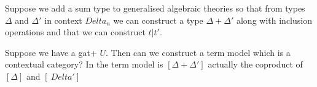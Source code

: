 \documentclass[10pt,a4paper]{article}
\theoremstyle{remark}
\begin{document}
\note Suppose we add a sum type to generalised algebraic theories so that from
types $\Delta$ and $\Delta'$ in context $Delta_n$ we can construct a type $\Delta + \Delta'$
along with inclusion operations and that we can construct $t | t'$. 

\note Suppose we have a gat+ $U$. Then can we construct a term model which is a contextual category?
In the term model is $[\Delta + \Delta']$ actually the coproduct of $[\Delta]$ and $[\
Delta'] $
\fi

% 


\end{document}
